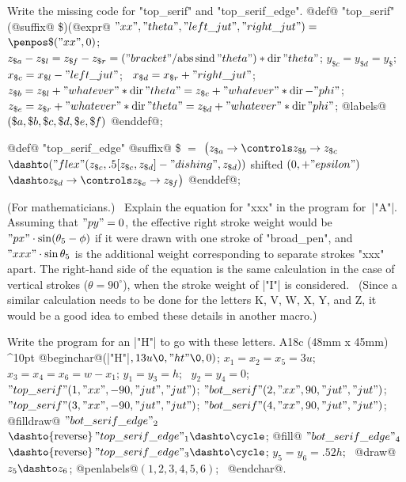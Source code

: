 {{{{\ddangerexercise Write the missing code for "top\_serif" and
"top\_serif\_edge".
\answer @def@ "top\_serif"(@suffix@ \$)(@expr@ $"xx","theta",
 "left\_jut","right\_jut")=$\parbreak
\quad $\penpos\$("xx",0)$; \
$z_{\$a}-z_{\$l}=z_{\$\mkern-1muf}-z_{\$r}=
 ("bracket"/{\rm abs\,sind\,}"theta")\ast{\rm dir}\,"theta"$;\parbreak
\quad $y_{\$c}=y_{\$d}=y_\$$; \
 $x_{\$c}=x_{\$l}-"left\_jut"$; \ $x_{\$d}=x_{\$r}+"right\_jut"$;\parbreak
\quad $z_{\$b}=z_{\$l}+"whatever"\ast{\rm dir}\,"theta"
 =z_{\$c}+"whatever"\ast{\rm dir}\,{-"phi"}$;\parbreak
\quad $z_{\$e}=z_{\$r}+"whatever"\ast{\rm dir}\,"theta"
 =z_{\$d}+"whatever"\ast{\rm dir}\,"phi"$;\parbreak
\quad @labels@$(\$a,\$b,\$c,\$d,\$e,\$\mkern-1muf)$ @enddef@;\par
\smallskip\indent
@def@ "top\_serif\_edge" @suffix@ \$ $=$\parbreak
\quad $\bigl(z_{\$a}\to\controls z_{\$b}\to z_{\$c}$\parbreak
\qquad $\dashto("flex"(z_{\$c},.5[z_{\$c},z_{\$d}]-"dishing",
 z_{\$d}))$ shifted $(0,+"epsilon")$\parbreak
\qquad $\dashto z_{\$d}\to\controls z_{\$e}\to z_{\$\mkern-1muf}
 \bigr)$ @enddef@;

\ddangerexercise (For mathematicians.) \
Explain the equation for "xxx" in the program for~|"A"|.
\answer Assuming that $"py"=0$, the effective right stroke weight would be
$"px"\cdot\sin(\theta_5-\phi)$ if it were drawn with one stroke of "broad\_pen",
and $"xxx"\cdot\sin\theta_5$ is the additional weight corresponding to separate
strokes "xxx" apart. The right-hand side of the equation is the same
calculation in the case of vertical strokes ($\theta=90^\circ$), when the
stroke weight of |"I"| is considered. \ (Since a similar calculation
needs to be done for the letters K, V, W, X, Y, and Z, it would be a good
idea to embed these details in another macro.)

\ddangerexercise Write the program for an |"H"| to go with these letters.
\answer \rightfig A18c (48mm x 45mm) ^10pt
@beginchar@\kern1pt(|"H"|$,13u\0,"ht"\0,0)$;\parbreak
$x_1=x_2=x_5=3u$;\parbreak
$x_3=x_4=x_6=w-x_1$;\parbreak
$y_1=y_3=h$; \ $y_2=y_4=0$;\parbreak
$"top\_serif"(1,"xx",-90,"jut","jut")$;\parbreak
$"bot\_serif"(2,"xx",90,"jut","jut")$;\parbreak
$"top\_serif"(3,"xx",-90,"jut","jut")$;\parbreak
$"bot\_serif"(4,"xx",90,"jut","jut")$;\parbreak
@filldraw@ $"bot\_serif\_edge"_2$\parbreak
\quad$\dashto{\rm reverse}\,"top\_serif\_edge"_1\dashto\cycle$;\parbreak
@fill@ $"bot\_serif\_edge"_4$\parbreak
\quad$\dashto{\rm reverse}\,"top\_serif\_edge"_3\dashto\cycle$;\parbreak
$y_5=y_6=.52h$; \ @draw@ $z_5\dashto z_6$;\parbreak
@penlabels@$(1,2,3,4,5,6)$; \ @endchar@.

}}}}
